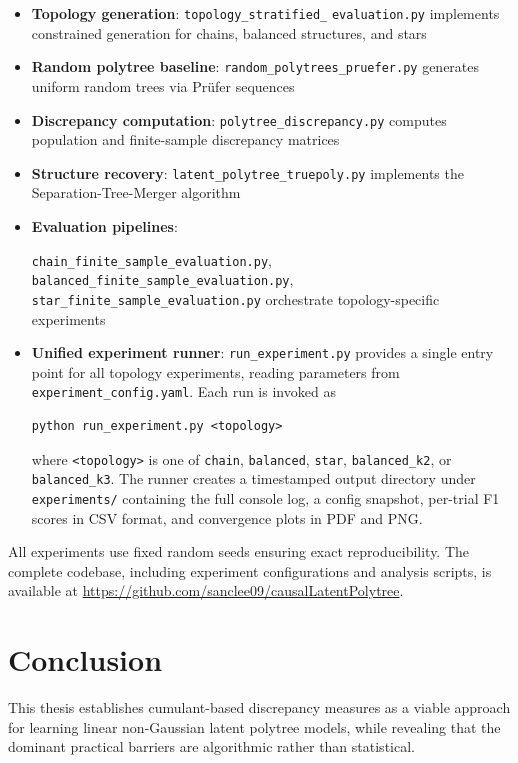 \documentclass[11pt,a4paper]{article}
\numberwithin{equation}{section}
\begin{document}
\begin{itemize}
\item \textbf{Topology generation}: \texttt{topology\_stratified\_} \texttt{evaluation.py} implements constrained generation for chains, balanced structures, and stars
\item \textbf{Random polytree baseline}: \texttt{random\_polytrees\_pruefer.py} generates uniform random trees via Prüfer sequences
\item \textbf{Discrepancy computation}: \texttt{polytree\_discrepancy.py} computes population and finite-sample discrepancy matrices
\item \textbf{Structure recovery}: \texttt{latent\_polytree\_truepoly.py} implements the Separation-Tree-Merger algorithm
\item \textbf{Evaluation pipelines}:
  \begin{sloppypar}
  \texttt{chain\_finite\_sample\_evaluation.py},
  \texttt{balanced\_finite\_sample\_evaluation.py},
  \texttt{star\_finite\_sample\_evaluation.py}
  orchestrate topology-specific experiments
  \end{sloppypar}
\item \textbf{Unified experiment runner}: \texttt{run\_experiment.py} provides a single entry point for all topology experiments, reading parameters from \texttt{experiment\_config.yaml}. Each run is invoked as
\begin{verbatim}
python run_experiment.py <topology>
\end{verbatim}
where \texttt{<topology>} is one of \texttt{chain}, \texttt{balanced}, \texttt{star}, \texttt{balanced\_k2}, or \texttt{balanced\_k3}. The runner creates a timestamped output directory under \texttt{experiments/} containing the full console log, a config snapshot, per-trial F1 scores in CSV format, and convergence plots in PDF and PNG.
\end{itemize}

All experiments use fixed random seeds ensuring exact reproducibility. The complete codebase, including experiment configurations and analysis scripts, is available at \url{https://github.com/sanclee09/causalLatentPolytree}.

\section{Conclusion}
\label{sec:conclusion}

This thesis establishes cumulant-based discrepancy measures as a viable approach for
learning linear non-Gaussian latent polytree models, while revealing that the dominant
practical barriers are algorithmic rather than statistical.
\end{document}
